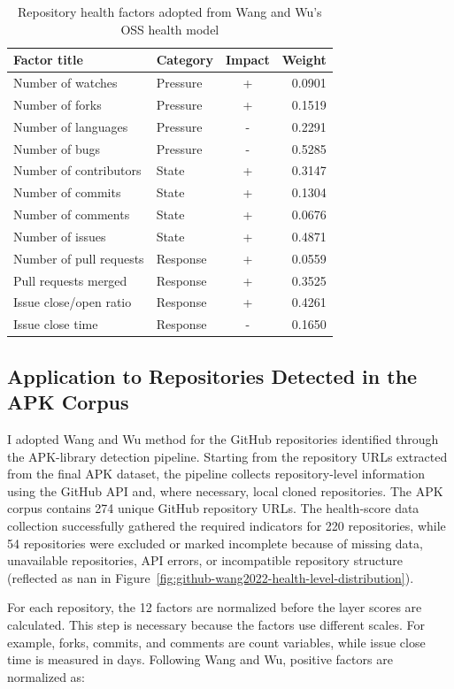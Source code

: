 \documentclass[12pt,a4paper]{report}
\begin{document}
\begin{table}[htbp]
\centering
\caption{Repository health factors adopted from Wang and Wu's OSS health model}
\label{tab:wang2022-health-factors}
\begin{tabular}{llcr}
\hline
\textbf{Factor title} & \textbf{Category} & \textbf{Impact} & \textbf{Weight} \\
\hline
Number of watches & Pressure & + & 0.0901 \\
Number of forks & Pressure & + & 0.1519 \\
Number of languages & Pressure & - & 0.2291 \\
Number of bugs & Pressure & - & 0.5285 \\
Number of contributors & State & + & 0.3147 \\
Number of commits & State & + & 0.1304 \\
Number of comments & State & + & 0.0676 \\
Number of issues & State & + & 0.4871 \\
Number of pull requests & Response & + & 0.0559 \\
Pull requests merged & Response & + & 0.3525 \\
Issue close/open ratio & Response & + & 0.4261 \\
Issue close time & Response & - & 0.1650 \\
\hline
\end{tabular}
\end{table}

\subsection{Application to Repositories Detected in the APK Corpus}

I adopted Wang and Wu method for the GitHub repositories identified through the APK-library detection pipeline. Starting from the repository URLs extracted from the final APK dataset, the pipeline collects repository-level information using the GitHub API and, where necessary, local cloned repositories. The APK corpus contains 274 unique GitHub repository URLs. The health-score data collection successfully gathered the required indicators for 220 repositories, while 54 repositories were excluded or marked incomplete because of missing data, unavailable repositories, API errors, or incompatible repository structure (reflected as nan in Figure~\ref{fig:github-wang2022-health-level-distribution}).

For each repository, the 12 factors are normalized before the layer scores are calculated. This step is necessary because the factors use different scales. For example, forks, commits, and comments are count variables, while issue close time is measured in days. Following Wang and Wu, positive factors are normalized as:
\end{document}
